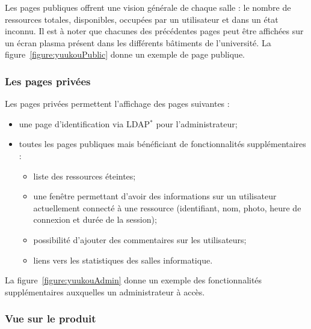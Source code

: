 \vspace{0.20cm}

Les pages publiques offrent une vision g\'en\'erale de chaque salle : le nombre de ressources totales, disponibles, occup\'ees par un utilisateur et dans un \'etat inconnu.
Il est \`a noter que chacunes des pr\'ec\'edentes pages peut \^etre affich\'ees sur un \'ecran plasma pr\'esent dans les diff\'erents b\^atiments de l'universit\'e.
La figure~\ref{figure:yuukouPublic} donne un exemple de page publique.

\subsubsection{Les pages priv\'ees}

\noindent Les pages priv\'ees permettent l'affichage des pages suivantes :

\begin{itemize}
	\item une page d'identification via LDAP$^*$ pour l'administrateur;
	\item toutes les pages publiques mais b\'en\'eficiant de fonctionnalit\'es suppl\'ementaires :

	\begin{itemize}
		\item liste des ressources \'eteintes;
		\item une fen\^etre permettant d'avoir des informations sur un utilisateur actuellement connect\'e \`a une ressource (identifiant, nom, photo, heure de connexion et dur\'ee de la session);
		\item possibilit\'e d'ajouter des commentaires sur les utilisateurs;
		\item liens vers les statistiques des salles informatique.

	\end{itemize}

\end{itemize}

\vspace{0.20cm}

La figure~\ref{figure:yuukouAdmin} donne un exemple des fonctionnalit\'es suppl\'ementaires auxquelles un administrateur \`a acc\`es.

\clearpage

\subsubsection{Vue sur le produit}

